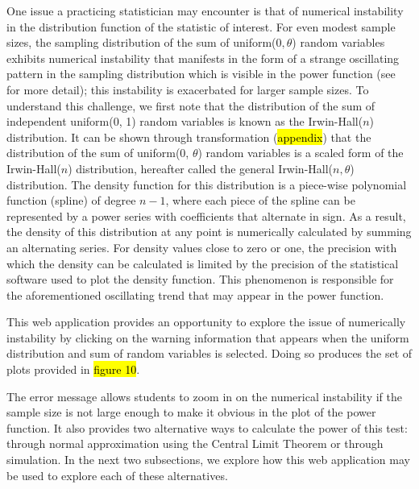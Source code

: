 \documentclass{TISE}
\begin{document}
One issue a practicing statistician may encounter is that of numerical instability in the distribution function of the statistic of interest. For even modest sample sizes, the sampling distribution of the sum of uniform($0, \theta$) random variables exhibits numerical instability that manifests in the form of a strange oscillating pattern in the sampling distribution which is visible in the power function (see \cite{alberto2019} for more detail); this instability is exacerbated for larger sample sizes.  To understand this challenge, we first note that the distribution of the sum of independent uniform(0, 1) random variables is known as the Irwin-Hall($n$) distribution. It can be shown through transformation (\hl{appendix}) that the distribution of the sum of uniform(0, $\theta$) random variables is a scaled form of the Irwin-Hall($n$) distribution, hereafter called the general Irwin-Hall($n, \theta$) distribution. The density function for this distribution is a piece-wise polynomial function (spline) of degree $n - 1$, where each piece of the spline can be represented by a power series with coefficients that alternate in sign. As a result, the density of this distribution at any point is numerically calculated by summing an alternating series. For density values close to zero or one, the precision with which the density can be calculated is limited by the precision of the statistical software used to plot the density function. This phenomenon is responsible for the aforementioned oscillating trend that may appear in the power function. 

This web application provides an opportunity to explore the issue of numerically instability by clicking on the warning information that appears when the uniform distribution and sum of random variables is selected. Doing so produces the set of plots provided in \hl{figure 10}. 

The error message allows students to zoom in on the numerical instability if the sample size is not large enough to make it obvious in the plot of the power function. It also provides two alternative ways to calculate the power of this test: through normal approximation using the Central Limit Theorem or through simulation. In the next two subsections, we explore how this web application may be used to explore each of these alternatives.
\end{document}
